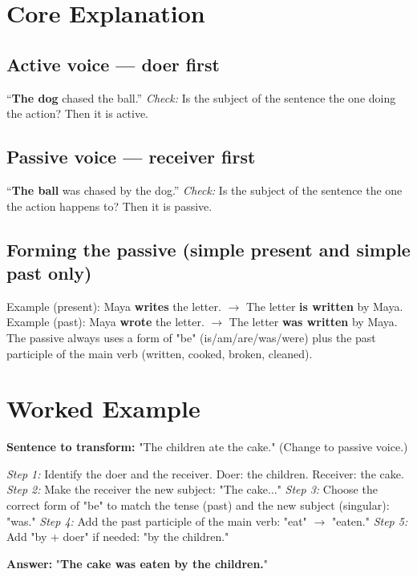 \section{Core Explanation}

\subsection*{Active voice — doer first}
``\textbf{The dog} chased the ball.'' \textit{Check:} Is the subject of the sentence the one doing the action? Then it is active.

\subsection*{Passive voice — receiver first}
``\textbf{The ball} was chased by the dog.'' \textit{Check:} Is the subject of the sentence the one the action happens to? Then it is passive.

\subsection*{Forming the passive (simple present and simple past only)}
Example (present): Maya \textbf{writes} the letter. $\rightarrow$ The letter \textbf{is written} by Maya.
Example (past): Maya \textbf{wrote} the letter. $\rightarrow$ The letter \textbf{was written} by Maya.
The passive always uses a form of "be" (is/am/are/was/were) plus the past participle of the main verb (written, cooked, broken, cleaned).

\section{Worked Example}
\begin{examplebox}
\textbf{Sentence to transform:} "The children ate the cake." (Change to passive voice.)

\textit{Step 1:} Identify the doer and the receiver. Doer: the children. Receiver: the cake.
\textit{Step 2:} Make the receiver the new subject: "The cake..."
\textit{Step 3:} Choose the correct form of "be" to match the tense (past) and the new subject (singular): "was."
\textit{Step 4:} Add the past participle of the main verb: "eat" $\rightarrow$ "eaten."
\textit{Step 5:} Add "by + doer" if needed: "by the children."

\textbf{Answer:} "\textbf{The cake was eaten by the children.}"
\end{examplebox}

